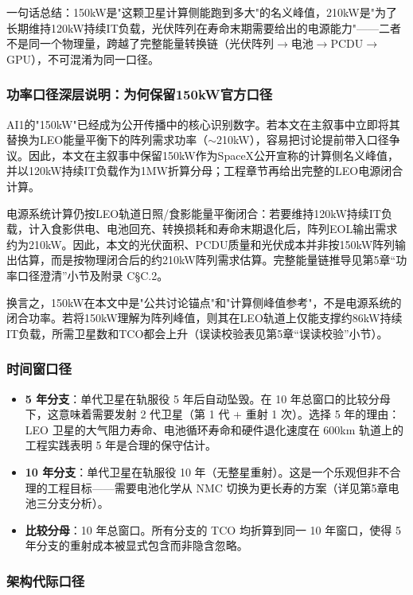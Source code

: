 一句话总结：150\;kW是"这颗卫星计算侧能跑到多大"的名义峰值，210\;kW是"为了长期维持120\;kW持续IT负载，光伏阵列在寿命末期需要给出的电源能力"——二者不是同一个物理量，跨越了完整能量转换链（光伏阵列$\to$电池$\to$PCDU$\to$GPU），不可混淆为同一口径。

\subsubsection{功率口径深层说明：为何保留150kW官方口径}

AI1的"150\;kW"已经成为公开传播中的核心识别数字。若本文在主叙事中立即将其替换为LEO能量平衡下的阵列需求功率（$\sim$210\;kW），容易把讨论提前带入口径争议。因此，本文在主叙事中保留150\;kW作为SpaceX公开宣称的计算侧名义峰值，并以120\;kW持续IT负载作为1\;MW折算分母；工程章节再给出完整的LEO电源闭合计算。

电源系统计算仍按LEO轨道日照/食影能量平衡闭合：若要维持120\;kW持续IT负载，计入食影供电、电池回充、转换损耗和寿命末期退化后，阵列EOL输出需求约为210\;kW。因此，本文的光伏面积、PCDU质量和光伏成本并非按150\;kW阵列输出估算，而是按物理闭合后的约210\;kW阵列需求估算。完整能量链推导见第5章“功率口径澄清”小节及附录 C\;\S C.2。

换言之，150\;kW在本文中是"公共讨论锚点"和"计算侧峰值参考"，不是电源系统的闭合功率。若将150\;kW理解为阵列峰值，则其在LEO轨道上仅能支撑约86\;kW持续IT负载，所需卫星数和TCO都会上升（误读校验表见第5章“误读校验”小节）。

\subsubsection{时间窗口径}

\begin{itemize}[leftmargin=*]
    \item \textbf{5 年分支}：单代卫星在轨服役 5 年后自动坠毁。在 10 年总窗口的比较分母下，这意味着需要发射 2 代卫星（第 1 代 + 重射 1 次）。选择 5 年的理由：LEO 卫星的大气阻力寿命、电池循环寿命和硬件退化速度在 600\;km 轨道上的工程实践表明 5 年是合理的保守估计。
    \item \textbf{10 年分支}：单代卫星在轨服役 10 年（无整星重射）。这是一个乐观但非不合理的工程目标——需要电池化学从 NMC 切换为更长寿的方案（详见第5章电池三分支分析）。
    \item \textbf{比较分母}：10 年总窗口。所有分支的 TCO 均折算到同一 10 年窗口，使得 5 年分支的重射成本被显式包含而非隐含忽略。
\end{itemize}

\subsubsection{架构代际口径}

